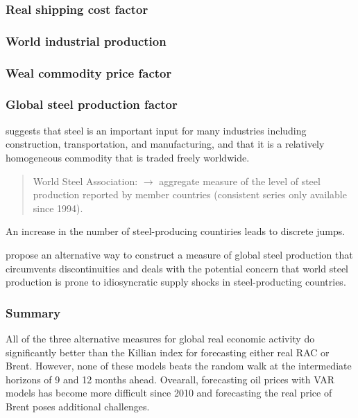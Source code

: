 \subsubsection{Real shipping cost factor}

\subsubsection{World industrial production}

\subsubsection{Weal commodity price factor}

\subsubsection{Global steel production factor}

\cite{ravazzolo2020world} suggests that steel is an important input for many industries including construction, transportation, and manufacturing, and that it is a relatively homogeneous commodity that is traded freely worldwide.

\begin{quote}
	World Steel Association: $\to$ aggregate measure of the level of steel production reported by member countries (consistent series only available since 1994).
\end{quote}

An increase in the number of steel-producing countiries leads to discrete jumps.

\cite{baumeister2020energy} propose an alternative way to construct a measure of global steel production that circumvents discontinuities and deals with the potential concern that world steel production is prone to idiosyncratic supply shocks in steel-producting countries.

\subsubsection{Summary}

All of the three alternative measures for global real economic activity do significantly better than the Killian index for forecasting either real RAC or Brent. However, none of these models beats the random walk at the intermediate horizons of 9 and 12 months ahead. Ovearall, forecasting oil prices with VAR models has become more difficult since 2010 and forecasting the real price of Brent poses additional challenges.

